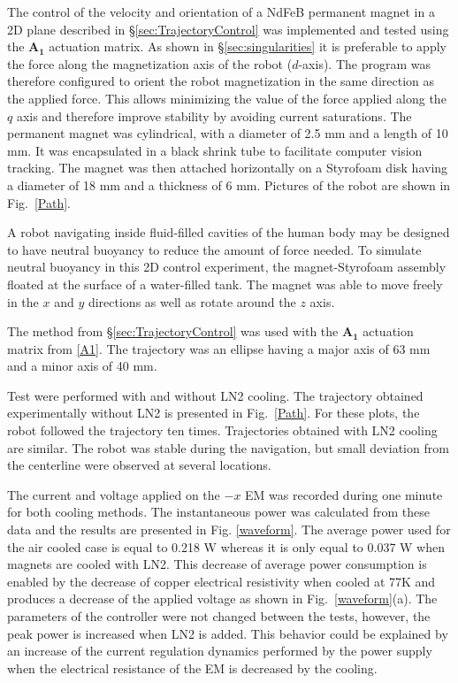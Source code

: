 The control of the velocity and orientation of a NdFeB permanent magnet in a 2D plane described in \S\ref{sec:TrajectoryControl} was implemented and tested using the $\mathbf{A_1}$ actuation matrix. As shown in \S\ref{sec:singularities} it is preferable to apply the force along the magnetization axis of the robot ($d$-axis). The program was therefore configured to orient the robot magnetization in the same direction as the applied force. This allows minimizing the value of the force applied along the $q$ axis and therefore improve stability by avoiding current saturations.
The permanent magnet was cylindrical, with a diameter of 2.5 mm and a length of 10 mm. 
It was encapsulated in a black shrink tube to facilitate computer vision tracking. 
The magnet was then attached horizontally on a Styrofoam disk having a diameter of 18 mm and a thickness of 6 mm. 
Pictures of the robot are shown in Fig.~\ref{Path}. 

A robot navigating inside fluid-filled cavities of the human body may be designed to have neutral buoyancy to reduce the amount of force needed. 
To simulate neutral buoyancy in this 2D control experiment, the magnet-Styrofoam assembly floated at the surface of a water-filled tank. The magnet was able to move freely in the $x$ and $y$ directions as well as rotate around the $z$ axis.\par
The method from \S\ref{sec:TrajectoryControl} was used with the $\mathbf{A_1}$ actuation matrix from \eqref{A1}.
 The trajectory was an ellipse having a major axis of 63 mm and a minor axis of 40 mm.

Test were performed with and without LN2 cooling. The trajectory obtained experimentally without LN2 is presented in Fig.~\ref{Path}. For these plots, the robot followed the trajectory ten times. Trajectories obtained with LN2 cooling are similar. The robot was stable during the navigation, but small deviation from the centerline were observed at several locations. 

The current and voltage applied on the $-x$ EM was recorded during one minute for both cooling methods. The instantaneous power was calculated from these data and the results are presented in Fig. \ref{waveform}. The average power used for the air cooled case is equal to 0.218 W whereas it is only equal to 0.037 W when magnets are cooled with LN2.  This decrease of average power consumption is enabled by the decrease of copper electrical resistivity when cooled at 77K and produces a decrease of the applied voltage as shown in  Fig.~\ref{waveform}(a).  The parameters of the controller were not changed between the tests, however, the peak power is increased when LN2 is added. This behavior could be explained by an increase of the current regulation dynamics performed by the power supply when the electrical resistance of the EM is decreased by the cooling. 

